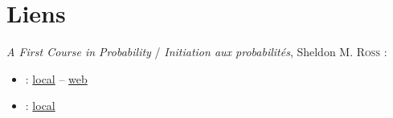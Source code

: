 \chapter*{Liens}

\emph{A First Course in Probability} / \emph{Initiation aux probabilités}, Sheldon M. \textsc{Ross} :
\newlength{\longueur}
\begin{itemize}
	\item {} :
		\href{ross/8EdEn.pdf}{local} --
		\href{http://julio.staff.ipb.ac.id/files/2015/02/Ross_8th_ed_English.pdf}{web}
	\item {} :
		\href{ross/10EdEn.pdf}{local}
\end{itemize}

